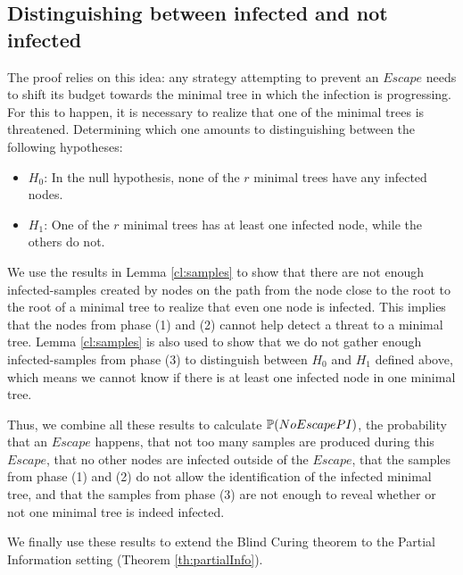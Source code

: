 \subsection{Distinguishing between infected and not infected}
The proof relies on this idea: any strategy attempting to prevent an $Escape$ needs to shift its budget towards the minimal tree in which the infection is progressing. For this to happen, it is necessary to realize that one of the minimal trees is threatened. Determining which one amounts to distinguishing between the following hypotheses: 
\begin{itemize}
\item $H_0$: In the null hypothesis, none of the $r$ minimal trees have any infected nodes.
\item $H_1$: One of the $r$ minimal trees has at least one infected node, while the others do not.
\end{itemize}

We use the results in Lemma \ref{cl:samples} to show that there are not enough infected-samples created by nodes on the path from the node close to the root to the root of a minimal tree to realize that even one node is infected. This implies that the nodes from phase (1) and (2) cannot help detect a threat to a minimal tree. Lemma  \ref{cl:samples} is also used to show that we do not gather enough infected-samples from phase (3) to distinguish between $H_0$ and $H_1$ defined above, which means we cannot know if there is at least one infected node in one minimal tree.

Thus, we combine all these results to calculate $\mathbb{P}(NoEscapePI)$, the probability that an $Escape$ happens, that not too many samples are produced during this $Escape$, that no other nodes are infected outside of the $Escape$, that the samples from phase (1) and (2) do not allow the identification of the infected minimal tree, and that the samples from phase (3) are not enough to reveal whether or not one minimal tree is indeed infected. 

We finally use these results to extend the Blind Curing theorem to the Partial Information setting (Theorem \ref{th:partialInfo}).


